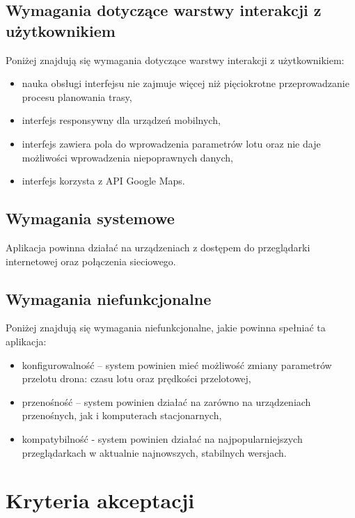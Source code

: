 \subsection{Wymagania dotyczące warstwy interakcji z użytkownikiem}

Poniżej znajdują się wymagania dotyczące warstwy interakcji z użytkownikiem: 

\begin{itemize}
    \item nauka obsługi interfejsu nie zajmuje więcej niż pięciokrotne przeprowadzanie procesu planowania trasy,
    \item interfejs responsywny dla urządzeń mobilnych,
    \item interfejs zawiera pola do wprowadzenia parametrów lotu oraz nie daje możliwości wprowadzenia niepoprawnych danych,
    \item interfejs korzysta z API Google Maps.
\end{itemize}

\subsection{Wymagania systemowe}
Aplikacja powinna działać na urządzeniach z dostępem do przeglądarki internetowej oraz połączenia sieciowego. 

\subsection{Wymagania niefunkcjonalne}

Poniżej znajdują się wymagania niefunkcjonalne, jakie powinna spełniać ta aplikacja:

\begin{itemize}
    \item konfigurowalność -- system powinien mieć możliwość zmiany parametrów przelotu drona: czasu lotu oraz prędkości przelotowej,
    \item przenośność -- system powinien działać na zarówno na urządzeniach przenośnych, jak i komputerach stacjonarnych,
    \item kompatybilność - system powinien działać na najpopularniejszych przeglądarkach w aktualnie najnowszych, stabilnych wersjach.
\end{itemize}

\section{Kryteria akceptacji}

